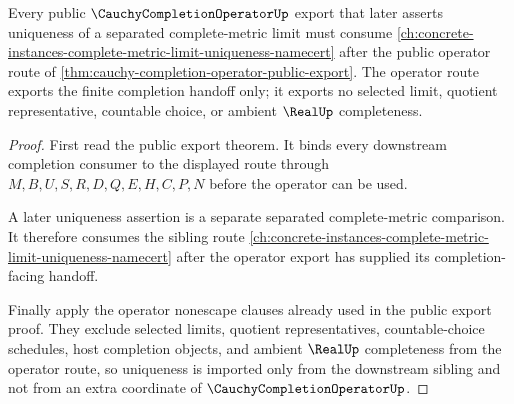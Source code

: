 \begin{theorem}
\label{thm:complete-metric-limit-uniqueness-outbound-ref}
Every public $\CauchyCompletionOperatorUp$ export that later asserts uniqueness of a separated complete-metric limit must consume \autoref{ch:concrete-instances-complete-metric-limit-uniqueness-namecert} after the public operator route of \autoref{thm:cauchy-completion-operator-public-export}. The operator route exports the finite completion handoff only; it exports no selected limit, quotient representative, countable choice, or ambient $\RealUp$ completeness.
\end{theorem}
\begin{proof}
First read the public export theorem. It binds every downstream completion consumer to the displayed route through $M,B,U,S,R,D,Q,E,H,C,P,N$ before the operator can be used.

A later uniqueness assertion is a separate separated complete-metric comparison. It therefore consumes the sibling route \autoref{ch:concrete-instances-complete-metric-limit-uniqueness-namecert} after the operator export has supplied its completion-facing handoff.

Finally apply the operator nonescape clauses already used in the public export proof. They exclude selected limits, quotient representatives, countable-choice schedules, host completion objects, and ambient $\RealUp$ completeness from the operator route, so uniqueness is imported only from the downstream sibling and not from an extra coordinate of $\CauchyCompletionOperatorUp$.
\end{proof}

